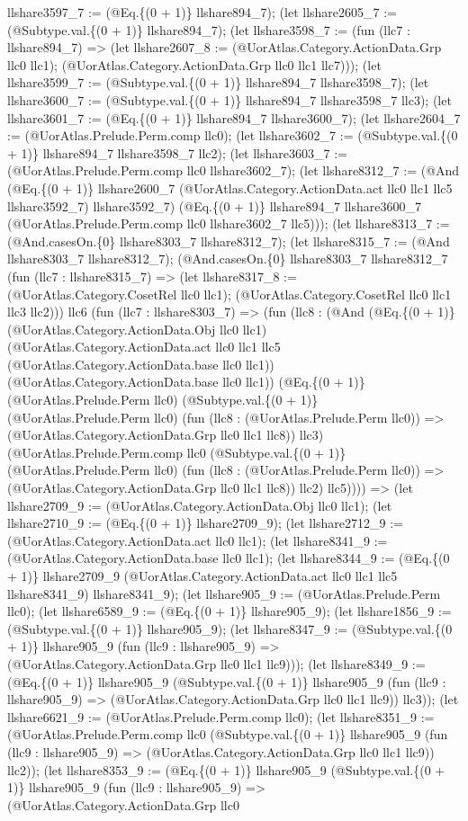 \documentclass[11pt]{article}
\begin{document}
llshare3597\_7 := (@Eq.\{(0 + 1)\} llshare894\_7); (let llshare2605\_7 := (@Subtype.val.\{(0 + 1)\} llshare894\_7); (let llshare3598\_7 := (fun (llc7 : llshare894\_7) => (let llshare2607\_8 := (@UorAtlas.Category.ActionData.Grp llc0 llc1); (@UorAtlas.Category.ActionData.Grp llc0 llc1 llc7))); (let llshare3599\_7 := (@Subtype.val.\{(0 + 1)\} llshare894\_7 llshare3598\_7); (let llshare3600\_7 := (@Subtype.val.\{(0 + 1)\} llshare894\_7 llshare3598\_7 llc3); (let llshare3601\_7 := (@Eq.\{(0 + 1)\} llshare894\_7 llshare3600\_7); (let llshare2604\_7 := (@UorAtlas.Prelude.Perm.comp llc0); (let llshare3602\_7 := (@Subtype.val.\{(0 + 1)\} llshare894\_7 llshare3598\_7 llc2); (let llshare3603\_7 := (@UorAtlas.Prelude.Perm.comp llc0 llshare3602\_7); (let llshare8312\_7 := (@And (@Eq.\{(0 + 1)\} llshare2600\_7 (@UorAtlas.Category.ActionData.act llc0 llc1 llc5 llshare3592\_7) llshare3592\_7) (@Eq.\{(0 + 1)\} llshare894\_7 llshare3600\_7 (@UorAtlas.Prelude.Perm.comp llc0 llshare3602\_7 llc5))); (let llshare8313\_7 := (@And.casesOn.\{0\} llshare8303\_7 llshare8312\_7); (let llshare8315\_7 := (@And llshare8303\_7 llshare8312\_7); (@And.casesOn.\{0\} llshare8303\_7 llshare8312\_7 (fun (llc7 : llshare8315\_7) => (let llshare8317\_8 := (@UorAtlas.Category.CosetRel llc0 llc1); (@UorAtlas.Category.CosetRel llc0 llc1 llc3 llc2))) llc6 (fun (llc7 : llshare8303\_7) => (fun (llc8 : (@And (@Eq.\{(0 + 1)\} (@UorAtlas.Category.ActionData.Obj llc0 llc1) (@UorAtlas.Category.ActionData.act llc0 llc1 llc5 (@UorAtlas.Category.ActionData.base llc0 llc1)) (@UorAtlas.Category.ActionData.base llc0 llc1)) (@Eq.\{(0 + 1)\} (@UorAtlas.Prelude.Perm llc0) (@Subtype.val.\{(0 + 1)\} (@UorAtlas.Prelude.Perm llc0) (fun (llc8 : (@UorAtlas.Prelude.Perm llc0)) => (@UorAtlas.Category.ActionData.Grp llc0 llc1 llc8)) llc3) (@UorAtlas.Prelude.Perm.comp llc0 (@Subtype.val.\{(0 + 1)\} (@UorAtlas.Prelude.Perm llc0) (fun (llc8 : (@UorAtlas.Prelude.Perm llc0)) => (@UorAtlas.Category.ActionData.Grp llc0 llc1 llc8)) llc2) llc5)))) => (let llshare2709\_9 := (@UorAtlas.Category.ActionData.Obj llc0 llc1); (let llshare2710\_9 := (@Eq.\{(0 + 1)\} llshare2709\_9); (let llshare2712\_9 := (@UorAtlas.Category.ActionData.act llc0 llc1); (let llshare8341\_9 := (@UorAtlas.Category.ActionData.base llc0 llc1); (let llshare8344\_9 := (@Eq.\{(0 + 1)\} llshare2709\_9 (@UorAtlas.Category.ActionData.act llc0 llc1 llc5 llshare8341\_9) llshare8341\_9); (let llshare905\_9 := (@UorAtlas.Prelude.Perm llc0); (let llshare6589\_9 := (@Eq.\{(0 + 1)\} llshare905\_9); (let llshare1856\_9 := (@Subtype.val.\{(0 + 1)\} llshare905\_9); (let llshare8347\_9 := (@Subtype.val.\{(0 + 1)\} llshare905\_9 (fun (llc9 : llshare905\_9) => (@UorAtlas.Category.ActionData.Grp llc0 llc1 llc9))); (let llshare8349\_9 := (@Eq.\{(0 + 1)\} llshare905\_9 (@Subtype.val.\{(0 + 1)\} llshare905\_9 (fun (llc9 : llshare905\_9) => (@UorAtlas.Category.ActionData.Grp llc0 llc1 llc9)) llc3)); (let llshare6621\_9 := (@UorAtlas.Prelude.Perm.comp llc0); (let llshare8351\_9 := (@UorAtlas.Prelude.Perm.comp llc0 (@Subtype.val.\{(0 + 1)\} llshare905\_9 (fun (llc9 : llshare905\_9) => (@UorAtlas.Category.ActionData.Grp llc0 llc1 llc9)) llc2)); (let llshare8353\_9 := (@Eq.\{(0 + 1)\} llshare905\_9 (@Subtype.val.\{(0 + 1)\} llshare905\_9 (fun (llc9 : llshare905\_9) => (@UorAtlas.Category.ActionData.Grp llc0 
\end{document}
